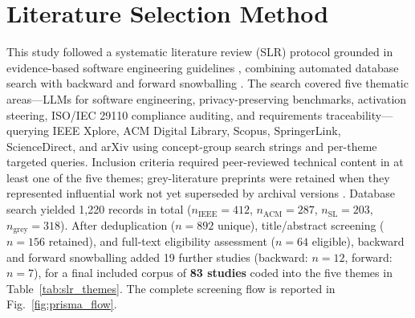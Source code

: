 \documentclass{ieeeaccess}
\begin{document}
\section{Literature Selection Method}
\label{sec:slr_methodology}

This study followed a systematic literature review (SLR) protocol grounded in evidence-based software engineering guidelines \cite{kitchenham2007guidelines,kitchenham2010tertiary}, combining automated database search with backward and forward snowballing \cite{wohlin2014snowballing,wohlin2022hybrid}. The search covered five thematic areas---LLMs for software engineering, privacy-preserving benchmarks, activation steering, ISO/IEC 29110 compliance auditing, and requirements traceability---querying IEEE Xplore, ACM Digital Library, Scopus, SpringerLink, ScienceDirect, and arXiv using concept-group search strings and per-theme targeted queries. Inclusion criteria required peer-reviewed technical content in at least one of the five themes; grey-literature preprints were retained when they represented influential work not yet superseded by archival versions \cite{touvron2023llama,jiang2023mistral,abdin2024phi3,riviere2024gemma2,yang2024qwen25}. Database search yielded 1{,}220 records in total ($n_{\text{IEEE}}=412$, $n_{\text{ACM}}=287$, $n_{\text{SL}}=203$, $n_{\text{grey}}=318$). After deduplication ($n=892$ unique), title/abstract screening ($n=156$ retained), and full-text eligibility assessment ($n=64$ eligible), backward and forward snowballing added 19 further studies (backward: $n=12$, forward: $n=7$), for a final included corpus of \textbf{83 studies} coded into the five themes in Table~\ref{tab:slr_themes}. The complete screening flow is reported in Fig.~\ref{fig:prisma_flow}.
\end{document}
